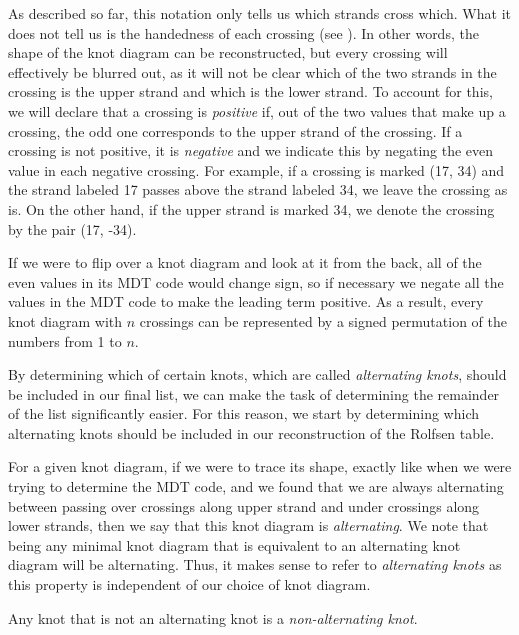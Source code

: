 \begin{paper}
As described so far, this notation only tells us which strands cross which.
What it does not tell us is the handedness of each crossing (see \figCrossings).
In other words, the shape of the knot diagram can be reconstructed, but every
crossing will effectively be blurred out, as it will not be clear which of the
two strands in the crossing is the upper strand and which is the lower strand.
To account for this, we will declare that a crossing is \textit{positive} if,
out of the two values that make up a crossing, the odd one corresponds to the
upper strand of the crossing.
If a crossing is not positive, it is \textit{negative} and we indicate this by
negating the even value in each negative crossing.
For example, if a crossing is marked (17, 34) and the strand labeled 17 passes
above the strand labeled 34, we leave the crossing as is.
On the other hand, if the upper strand is marked 34, we denote the crossing by
the pair (17, -34).

If we were to flip over a knot diagram and look at it from the back, all of the
even values in its MDT code would change sign, so if necessary we negate all the
values in the MDT code to make the leading term positive.
As a result, every knot diagram with $n$ crossings can be represented by a
signed permutation of the numbers from 1 to $n$.


By determining which of certain knots, which are called
\textit{alternating knots}, should be included in our final list, we can make
the task of determining the remainder of the list significantly easier.
For this reason, we start by determining which alternating knots should be
included in our reconstruction of the Rolfsen table.

For a given knot diagram, if we were to trace its shape, exactly like when we
were trying to determine the MDT code, and we found that we are always
alternating between passing over crossings along upper strand and under
crossings along lower strands, then we say that this knot diagram is
\textit{alternating}.
We note that being any minimal knot diagram that is equivalent to an alternating
knot diagram will be alternating.
Thus, it makes sense to refer to \textit{alternating knots} as this property is
independent of our choice of knot diagram.

Any knot that is not an alternating knot is a \textit{non-alternating knot}.


\end{paper}

